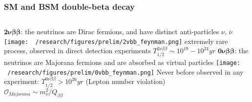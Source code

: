 \documentclass{beamer}
\begin{document}
	\begin{frame}
		\frametitle{SM and BSM double-beta decay}
		\begin{columns}[c] %
			{\footnotesize $\boldsymbol{2\nu\beta\beta}$: the neutrinos are Dirac fermions, and have distinct anti-particles $\nu$, $\overline{\nu}$} 
			\medskip
			\texttt{[image: ~/research/figures/prelim/2vbb\_feynman.png]}
			{\footnotesize extremely rare process, observed in direct detection experiments $T_{1/2}^{2\nu\beta\beta} \sim 10^{19}-10^{24} yr$}
			{\footnotesize $\boldsymbol{0\nu\beta\beta}$: the neutrinos are Majorana fermions and are absorbed as virtual particles}
			\texttt{[image: ~/research/figures/prelim/0vbb\_feynman.png]}
			{\footnotesize Never before observed in any experiment:  $T_{1/2}^{0\nu\beta\beta} > 10^{26} yr$  (Lepton number violation) \\ $\mathcal{O}_{Majorana} \sim m_{\nu}^2/Q_{\beta\beta}$}
			
		\end{columns}
	\end{frame}		
	
\end{document}
